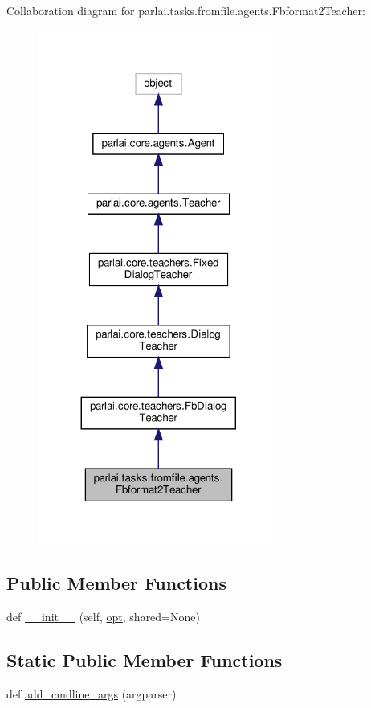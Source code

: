 Collaboration diagram for parlai.\+tasks.\+fromfile.\+agents.\+Fbformat2\+Teacher\+:
\nopagebreak
\begin{figure}[H]
\begin{center}
\leavevmode
\includegraphics[width=224pt]{classparlai_1_1tasks_1_1fromfile_1_1agents_1_1Fbformat2Teacher__coll__graph}
\end{center}
\end{figure}
\subsection*{Public Member Functions}
\begin{DoxyCompactItemize}
\item 
def \hyperlink{classparlai_1_1tasks_1_1fromfile_1_1agents_1_1Fbformat2Teacher_ab1420f53e945bfec70105e1e90f62580}{\+\_\+\+\_\+init\+\_\+\+\_\+} (self, \hyperlink{classparlai_1_1core_1_1teachers_1_1FbDialogTeacher_af7a9ec497b9cd0292d7b8fa220da7c28}{opt}, shared=None)
\end{DoxyCompactItemize}
\subsection*{Static Public Member Functions}
\begin{DoxyCompactItemize}
\item 
def \hyperlink{classparlai_1_1tasks_1_1fromfile_1_1agents_1_1Fbformat2Teacher_a5ddf39912ed941a77cc787a6e2d6db9a}{add\+\_\+cmdline\+\_\+args} (argparser)
\end{DoxyCompactItemize}
